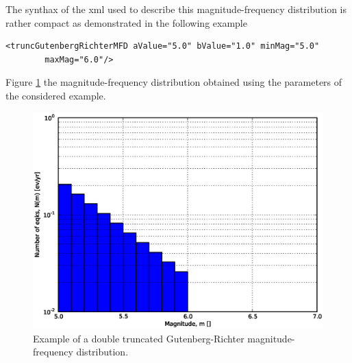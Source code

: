 \begin{description}
    The synthax of the xml used to describe this magnitude-frequency 
    distribution is rather compact as demonstrated in the following example
\begin{Verbatim}[frame=single, commandchars=\\\{\}, fontsize=\footnotesize]
<truncGutenbergRichterMFD aValue="5.0" bValue="1.0" minMag="5.0" 
        maxMag="6.0"/>
\end{Verbatim}
    Figure \ref{fig:dt_gr_mfd} the magnitude-frequency distribution 
    obtained using the parameters of the considered example.
\begin{figure}[!ht]
\centering
\includegraphics[width=12cm]{./figures/hazard/dt_mfd.eps}
\caption{Example of a double truncated Gutenberg-Richter 
magnitude-frequency distribution.}
\label{fig:dt_gr_mfd}
\end{figure}
%
%

\end{description}
